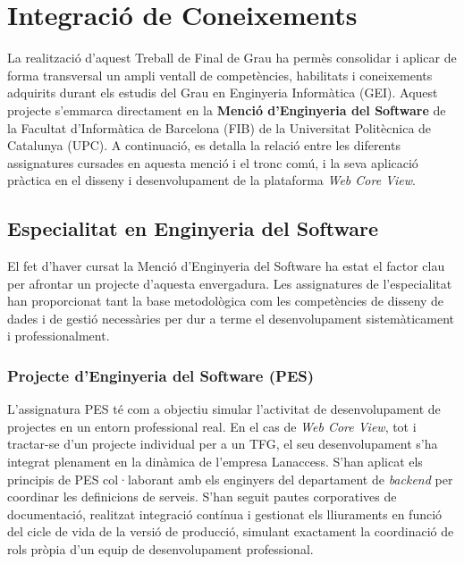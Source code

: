 \chapter{Integració de Coneixements}
\label{ch:integracio}

La realització d'aquest Treball de Final de Grau ha permès consolidar i aplicar de forma transversal un ampli ventall de competències, habilitats i coneixements adquirits durant els estudis del Grau en Enginyeria Informàtica (GEI). Aquest projecte s'emmarca directament en la \textbf{Menció d'Enginyeria del Software} de la Facultat d'Informàtica de Barcelona (FIB) de la Universitat Politècnica de Catalunya (UPC). A continuació, es detalla la relació entre les diferents assignatures cursades en aquesta menció i el tronc comú, i la seva aplicació pràctica en el disseny i desenvolupament de la plataforma \textit{Web Core View}.

\section{Especialitat en Enginyeria del Software}
El fet d'haver cursat la Menció d'Enginyeria del Software ha estat el factor clau per afrontar un projecte d'aquesta envergadura. Les assignatures de l'especialitat han proporcionat tant la base metodològica com les competències de disseny de dades i de gestió necessàries per dur a terme el desenvolupament sistemàticament i professionalment.

\subsection{Projecte d'Enginyeria del Software (PES)}
L'assignatura PES té com a objectiu simular l'activitat de desenvolupament de projectes en un entorn professional real. En el cas de \textit{Web Core View}, tot i tractar-se d'un projecte individual per a un TFG, el seu desenvolupament s'ha integrat plenament en la dinàmica de l'empresa Lanaccess. S'han aplicat els principis de PES col·laborant amb els enginyers del departament de \textit{backend} per coordinar les definicions de serveis. S'han seguit pautes corporatives de documentació, realitzat integració contínua i gestionat els lliuraments en funció del cicle de vida de la versió de producció, simulant exactament la coordinació de rols pròpia d'un equip de desenvolupament professional.

